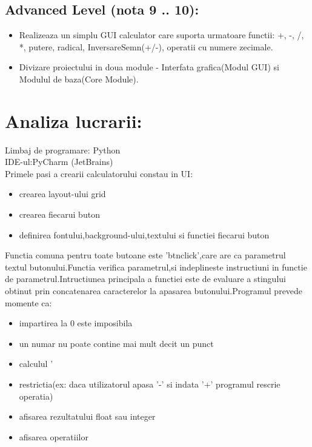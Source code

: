 \documentclass[12pt]{article}
\begin{document}
\subsection{Advanced Level (nota 9 .. 10):}
\begin{itemize}
\item Realizeaza un simplu GUI calculator care suporta urmatoare functii: +, -, /, *, putere, radical, InversareSemn(+/-), operatii cu numere zecimale.
\item Divizare proiectului in doua module - Interfata grafica(Modul GUI) si Modulul de baza(Core Module).
\end{itemize}
\section{Analiza lucrarii:}
Limbaj de programare: Python\\
IDE-ul:PyCharm (JetBrains)\\
Primele pasi a crearii calculatorului constau in UI:
\begin{itemize}
\item crearea layout-ului grid
\item crearea fiecarui buton 
\item definirea fontului,background-ului,textului si functiei fiecarui buton
\end{itemize}
Functia comuna pentru toate butoane este 'btnclick',care are ca parametrul textul butonului.Functia verifica parametrul,si indeplineste instructiuni in functie de parametrul.Intructiunea principala a functiei este de evaluare a stingului obtinut prin concatenarea caracterelor la apasarea butonului.Programul prevede momente ca:
\begin{itemize}
\item impartirea la 0 este imposibila
\item un numar nu poate contine mai mult decit un punct
\item calculul '%
\item restrictia(ex: daca utilizatorul apasa '-' si indata '+' programul rescrie operatia)
\item afisarea rezultatului float sau integer
\item afisarea operatiilor
\end{itemize}
\end{document}
